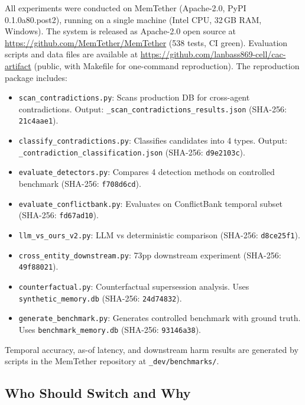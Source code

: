 \documentclass{article}
\begin{document}
All experiments were conducted on MemTether (Apache-2.0, PyPI 0.1.0a80.post2), running on a single machine (Intel CPU, 32\,GB RAM, Windows). The system is released as Apache-2.0 open source at \url{https://github.com/MemTether/MemTether} (538 tests, CI green). Evaluation scripts and data files are available at \url{https://github.com/lanbass869-cell/cac-artifact} (public, with Makefile for one-command reproduction). The reproduction package includes:

\begin{itemize}
\item \texttt{scan\_contradictions.py}: Scans production DB for cross-agent contradictions. Output: \texttt{\_scan\_contradictions\_results.json} (SHA-256: \texttt{21c4aae1}).
\item \texttt{classify\_contradictions.py}: Classifies candidates into 4 types. Output: \texttt{\_contradiction\_classification.json} (SHA-256: \texttt{d9e2103c}).
\item \texttt{evaluate\_detectors.py}: Compares 4 detection methods on controlled benchmark (SHA-256: \texttt{f708d6cd}).
\item \texttt{evaluate\_conflictbank.py}: Evaluates on ConflictBank temporal subset (SHA-256: \texttt{fd67ad10}).
\item \texttt{llm\_vs\_ours\_v2.py}: LLM vs deterministic comparison (SHA-256: \texttt{d8ce25f1}).
\item \texttt{cross\_entity\_downstream.py}: 73pp downstream experiment (SHA-256: \texttt{49f88021}).
\item \texttt{counterfactual.py}: Counterfactual supersession analysis. Uses \texttt{synthetic\_memory.db} (SHA-256: \texttt{24d74832}).
\item \texttt{generate\_benchmark.py}: Generates controlled benchmark with ground truth. Uses \texttt{benchmark\_memory.db} (SHA-256: \texttt{93146a38}).
\end{itemize}

Temporal accuracy, as-of latency, and downstream harm results are generated by scripts in the MemTether repository at \texttt{\_dev/benchmarks/}.


\subsection{Who Should Switch and Why}
\end{document}

